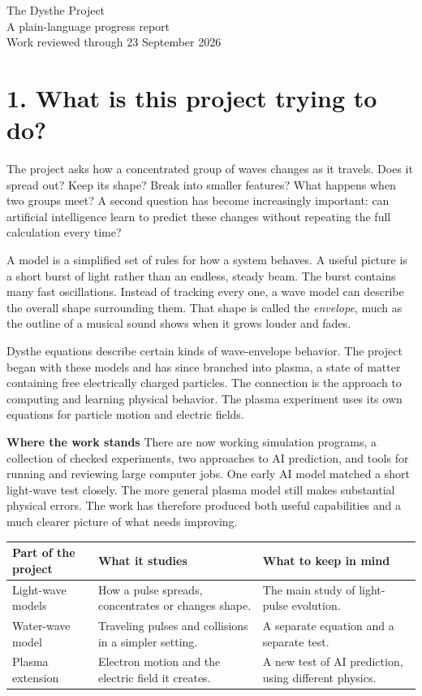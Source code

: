 \documentclass[11pt]{article}
\newcommand{\topic}[1]{\par\smallskip\noindent\textbf{#1}\quad}
\begin{document}
\begin{center}
{\Large The Dysthe Project}\\[5pt]
A plain-language progress report\\[6pt]
Work reviewed through 23 September 2026
\end{center}

\section*{1. What is this project trying to do?}
The project asks how a concentrated group of waves changes as it travels.
Does it spread out? Keep its shape? Break into smaller features? What
happens when two groups meet? A second question has become increasingly
important: can artificial intelligence learn to predict these changes
without repeating the full calculation every time?

A model is a simplified set of rules for how a system behaves.
A useful picture is a short burst of light rather than an endless, steady
beam. The burst contains many fast oscillations. Instead of tracking every
one, a wave model can describe the overall shape surrounding them. That
shape is called the \emph{envelope}, much as the outline of a musical sound
shows when it grows louder and fades.

Dysthe equations describe certain kinds of wave-envelope behavior. The
project began with these models and has since branched into plasma, a state
of matter containing free electrically charged particles. The connection is the approach
to computing and learning physical behavior. The plasma experiment uses
its own equations for particle motion and electric fields.

\topic{Where the work stands}
There are now working simulation programs, a collection of checked
experiments, two approaches to AI prediction, and tools for running and
reviewing large computer jobs. One early AI model matched a short light-wave
test closely. The more general plasma model still makes substantial
physical errors. The work has therefore produced both useful capabilities
and a much clearer picture of what needs improving.

\begin{center}
\small
\begin{tabular}{@{}p{3.1cm}p{6.2cm}p{5.9cm}@{}}
\toprule
Part of the project & What it studies & What to keep in mind \\
\midrule
Light-wave models & How a pulse spreads, concentrates or changes shape. & The main study of light-pulse evolution. \\
Water-wave model & Traveling pulses and collisions in a simpler setting. & A separate equation and a separate test. \\
Plasma extension & Electron motion and the electric field it creates. & A new test of AI prediction, using different physics. \\
\bottomrule
\end{tabular}
\end{center}
\end{document}
